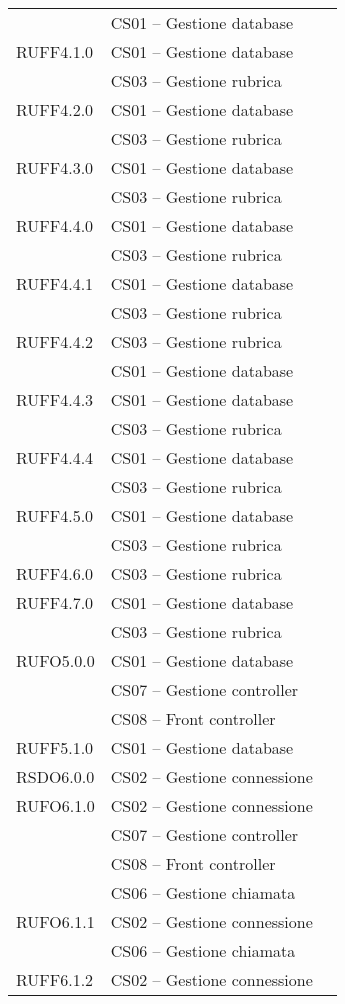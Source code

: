 \begin{center}
\begin{longtable}{lp{}l}
 & CS01 -- Gestione database \\
RUFF4.1.0 & CS01 -- Gestione database \\
 & CS03 -- Gestione rubrica \\
RUFF4.2.0 & CS01 -- Gestione database \\
 & CS03 -- Gestione rubrica \\
RUFF4.3.0 & CS01 -- Gestione database \\
 & CS03 -- Gestione rubrica \\
RUFF4.4.0 & CS01 -- Gestione database \\
 & CS03 -- Gestione rubrica \\
RUFF4.4.1 & CS01 -- Gestione database \\
 & CS03 -- Gestione rubrica \\
RUFF4.4.2 & CS03 -- Gestione rubrica \\
 & CS01 -- Gestione database \\
RUFF4.4.3 & CS01 -- Gestione database \\
 & CS03 -- Gestione rubrica \\
RUFF4.4.4 & CS01 -- Gestione database \\
 & CS03 -- Gestione rubrica \\
RUFF4.5.0 & CS01 -- Gestione database \\
 & CS03 -- Gestione rubrica \\
RUFF4.6.0 & CS03 -- Gestione rubrica \\
RUFF4.7.0 & CS01 -- Gestione database \\
 & CS03 -- Gestione rubrica \\
RUFO5.0.0 & CS01 -- Gestione database \\
 & CS07 -- Gestione controller \\
  & CS08 -- Front controller \\
RUFF5.1.0 & CS01 -- Gestione database \\
RSDO6.0.0 & CS02 -- Gestione connessione \\
RUFO6.1.0 & CS02 -- Gestione connessione \\
 & CS07 -- Gestione controller \\
  & CS08 -- Front controller \\
  & CS06 -- Gestione chiamata \\
RUFO6.1.1 & CS02 -- Gestione connessione \\
  & CS06 -- Gestione chiamata \\
RUFF6.1.2 & CS02 -- Gestione connessione \\

\end{longtable}
\end{center}
